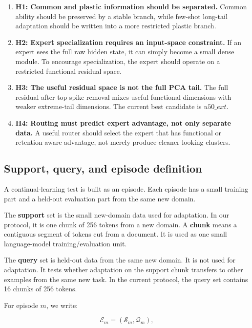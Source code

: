 \documentclass[11pt]{article}
\begin{document}
\begin{enumerate}[leftmargin=1.5em]
    \item \textbf{H1: Common and plastic information should be separated.}
    Common ability should be preserved by a stable branch, while few-shot long-tail adaptation should be written into a more restricted plastic branch.

    \item \textbf{H2: Expert specialization requires an input-space constraint.}
    If an expert sees the full raw hidden state, it can simply become a small dense module. To encourage specialization, the expert should operate on a restricted functional residual space.

    \item \textbf{H3: The useful residual space is not the full PCA tail.}
    The full residual after top-spike removal mixes useful functional dimensions with weaker extreme-tail dimensions. The current best candidate is $u50\_ext$.

    \item \textbf{H4: Routing must predict expert advantage, not only separate data.}
    A useful router should select the expert that has functional or retention-aware advantage, not merely produce cleaner-looking clusters.
\end{enumerate}

\subsection{Support, query, and episode definition}

A continual-learning test is built as an episode. Each episode has a small training part and a held-out evaluation part from the same new domain.

The \textbf{support} set is the small new-domain data used for adaptation. In our protocol, it is one chunk of 256 tokens from a new domain. A \textbf{chunk} means a contiguous segment of tokens cut from a document. It is used as one small language-model training/evaluation unit.

The \textbf{query} set is held-out data from the same new domain. It is not used for adaptation. It tests whether adaptation on the support chunk transfers to other examples from the same new task. In the current protocol, the query set contains 16 chunks of 256 tokens.

For episode $m$, we write:

$$
\mathcal{E}_m=(\mathcal{S}_m,\mathcal{Q}_m),
$$
\end{document}
